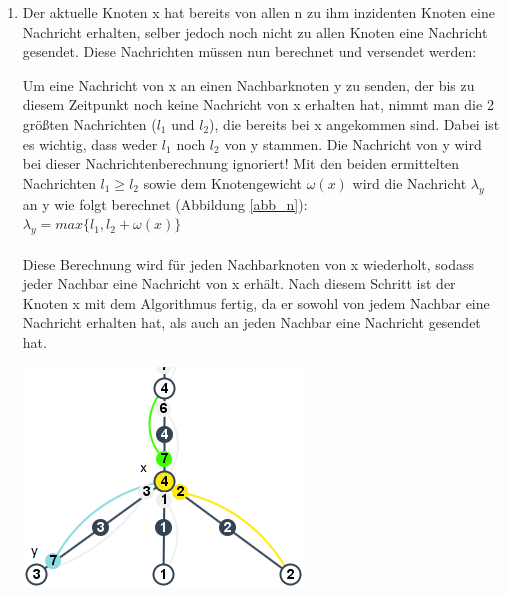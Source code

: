 \begin{enumerate}
\begin{enumerate}
				
			\item Der aktuelle Knoten x hat bereits von allen n zu ihm inzidenten Knoten eine Nachricht erhalten, selber jedoch noch nicht zu allen Knoten eine Nachricht gesendet. Diese Nachrichten müssen nun berechnet und versendet werden:\label{labelAufUnterfall}
			\\
				
				\begin{minipage}{0.50\textwidth} 
					
					Um eine Nachricht von x an einen Nachbarknoten y zu senden, der bis zu diesem Zeitpunkt noch keine Nachricht von x erhalten hat, nimmt man die 2 größten Nachrichten ($l_{1}$ und $l_{2}$), die bereits bei x angekommen sind. Dabei ist es wichtig, dass weder $l_{1}$ noch $l_{2}$ von y stammen. Die Nachricht von y wird bei dieser Nachrichtenberechnung ignoriert! Mit den beiden ermittelten Nachrichten $l_{1} \ge l_{2}$ sowie dem Knotengewicht $\omega(x)$ wird die Nachricht $\lambda_{y}$ an y wie folgt berechnet (Abbildung \ref{abb_n}):\\
					$\lambda_{y} = max\{l_{1},  l_{2} + \omega(x)\}$
					\\
					\\
					Diese Berechnung wird für jeden Nachbarknoten von x wiederholt, sodass jeder Nachbar eine Nachricht von x erhält. Nach diesem Schritt ist der Knoten x mit dem Algorithmus fertig, da er sowohl von jedem Nachbar eine Nachricht erhalten hat, als auch an jeden Nachbar eine Nachricht gesendet hat.
				\end{minipage}
				\hfill
				\begin{minipage}{0.35\textwidth}
					
					\includegraphics[width=\textwidth]{bilder/abb_paper_nknoten.png}
					\label{abb_n}
				\end{minipage}
			

\end{enumerate}
\end{enumerate}
